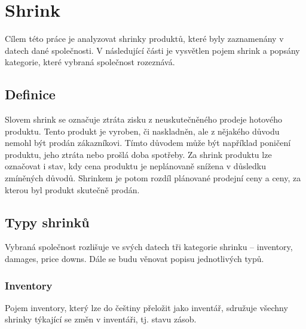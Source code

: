 \chapter{Shrink}

Cílem této práce je analyzovat shrinky produktů, které byly zaznamenány v datech dané společnosti. V následující části je vysvětlen pojem shrink a popsány kategorie, které vybraná společnost rozeznává.

\section{Definice}

Slovem shrink se označuje ztráta zisku z neuskutečněného prodeje hotového produktu. Tento produkt je vyroben, či naskladněn, ale z nějakého důvodu nemohl být prodán zákazníkovi. Tímto důvodem může být například poničení produktu, jeho ztráta nebo prošlá doba spotřeby. Za shrink produktu lze označovat i stav, kdy cena produktu je neplánovaně snížena v důsledku zmíněných důvodů. Shrinkem je potom rozdíl plánované prodejní ceny a ceny, za kterou byl produkt skutečně prodán.\cite{bib:DefShrink}



\section{Typy shrinků}

Vybraná společnost rozlišuje ve svých datech tři kategorie shrinku -- inventory, damages, price downs. Dále se budu věnovat popisu jednotlivých typů.

\subsection*{Inventory}

Pojem inventory, který lze do češtiny přeložit jako inventář, sdružuje všechny shrinky týkající se změn v inventáři, tj. stavu zásob.

